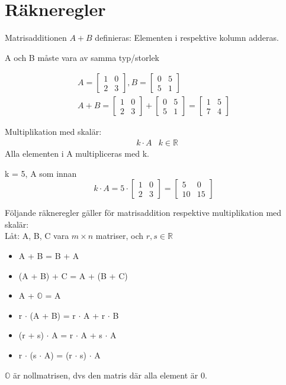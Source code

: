 \section{Räkneregler} %
\label{sec:r_kneregler}
Matrisadditionen $A + B$ definieras: Elementen i respektive kolumn adderas.
\begin{Rem}
    A och B måste vara av samma typ/storlek
\end{Rem}
\begin{Ex}
    \begin{gather*}
    	A = \begin{bmatrix} 1&0\\2&3 \end{bmatrix}, B = \begin{bmatrix} 0&5\\5&1 \end{bmatrix}\\
    	A + B = \begin{bmatrix} 1&0\\2&3 \end{bmatrix} + \begin{bmatrix} 0&5\\5&1 \end{bmatrix} = \begin{bmatrix} 1&5\\7&4 \end{bmatrix}
    \end{gather*}
\end{Ex}
\newpage
\noindent
Multiplikation med skalär: 
\begin{align*}
&k \cdot A &k \in \mathbb{R}
\end{align*}
Alla elementen i A multipliceras med k.
\begin{Ex}
    k = 5, A som innan
    \[
        k \cdot A = 5 \cdot \begin{bmatrix} 1&0\\2&3 \end{bmatrix} = \begin{bmatrix} 5&0\\10&15 \end{bmatrix}
    \]
\end{Ex}
Följande räkneregler gäller för matrisaddition respektive multiplikation med skalär:\\
Låt: A, B, C vara $m \times n$ matriser, och $r,s \in \mathbb{R}$
\begin{itemize}
	\item A + B = B + A
	\item (A + B) + C = A + (B + C)
	\item A + $\mathbb{O}$ = A
	\item r $\cdot$ (A + B) = r $\cdot$ A + r $\cdot$ B
	\item (r + s) $\cdot$ A = r $\cdot$ A + s $\cdot$ A
	\item r $\cdot$ (s $\cdot$ A) = (r $\cdot$ s) $\cdot$ A
\end{itemize}
\begin{Rem}
    $\mathbb{O}$ är nollmatrisen, dvs den matris där alla element är 0.
\end{Rem}



